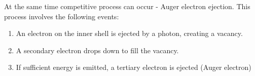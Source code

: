 At the same time competitive process can occur - Auger electron ejection. This process involves the following events\cite{augerElectron}:
\begin{enumerate}
    \item An electron on the inner shell is ejected by a photon, creating a vacancy.
    \item A secondary electron drops down to fill the vacancy.
    \item If sufficient energy is emitted, a tertiary electron is ejected (Auger electron)
\end{enumerate}
